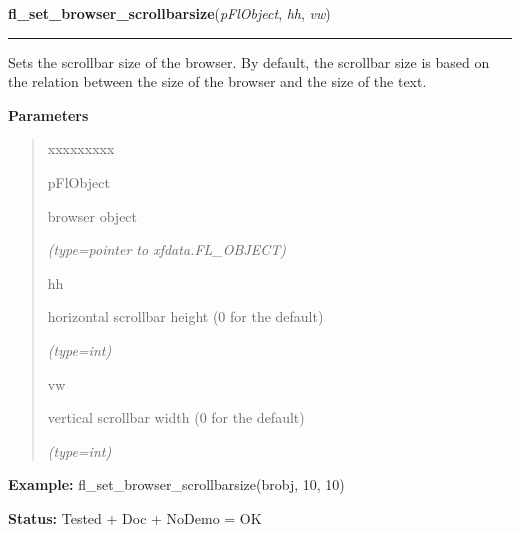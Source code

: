 \hspace{.8\funcindent}\begin{boxedminipage}{\funcwidth}

    \raggedright \textbf{fl\_set\_browser\_scrollbarsize}(\textit{pFlObject}, \textit{hh}, \textit{vw})

    \vspace{-1.5ex}

    \rule{\textwidth}{0.5\fboxrule}
\setlength{\parskip}{2ex}
    Sets the scrollbar size of the browser. By default, the scrollbar size 
    is based on the relation between the size of the browser and the size 
    of the text.

\setlength{\parskip}{1ex}
      \textbf{Parameters}
      \vspace{-1ex}

      \begin{quote}
        \begin{Ventry}{xxxxxxxxx}

          \item[pFlObject]

          browser object

            {\it (type=pointer to xfdata.FL\_OBJECT)}

          \item[hh]

          horizontal scrollbar height (0 for the default)

            {\it (type=int)}

          \item[vw]

          vertical scrollbar width (0 for the default)

            {\it (type=int)}

        \end{Ventry}

      \end{quote}

\textbf{Example:} fl\_set\_browser\_scrollbarsize(brobj, 10, 10)



\textbf{Status:} Tested + Doc + NoDemo = OK



    \end{boxedminipage}

    \label{xformslib:flbrowser:fl_show_browser_line}

